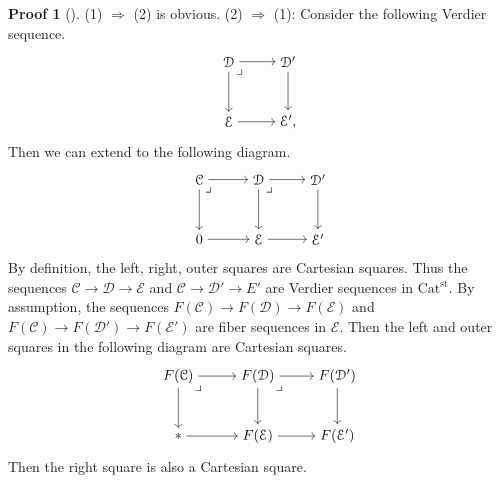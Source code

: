 \documentclass[a4paper,dvipdfmx,11pt,reqno]{amsart}
\newcommand{\C}{\mathcal{C}}
\newcommand{\D}{\mathcal{D}}
\newcommand{\E}{\mathcal{E}}
\newcommand{\Catst}{\mathrm{Cat^{st}}}
\theoremstyle{definition}
\newtheorem{newproof}[theorem]{Proof}
\begin{document}
\begin{newproof}[] \label{proof_of_CDH23.prop.1.5.5}
  (1) $\Rightarrow$ (2) is obvious.
  (2) $\Rightarrow$ (1): 
  Consider the following Verdier sequence.
  \[\begin{tikzpicture}[auto,->] 
    \node (tl) at (0,1.5) {$\D$}; 
    \node (tr) at (1.5,1.5) {$\D'$};
    \node (bl) at (0,0) {$\E$}; 
    \node (br) at (1.5,0) {$\E',$}; 
    \draw (tl) -- node {} (tr); 
    \draw (bl) -- node[swap] {} (br); 
    \draw (tl) -- node[swap] {} (bl);
    \draw (tr) -- node {} (br); 
    \node at (tl.south east) {$\lrcorner$};
  \end{tikzpicture}\]
  Then we can extend to the following diagram.
  \[\begin{tikzpicture}[auto,->] 
    \node (tl) at (0,1.5) {$\C$};
    \node (tm) at (1.5,1.5) {$\D$}; 
    \node (tr) at (3,1.5) {$\D'$};
    \node (bl) at (0,0) {$0$}; 
    \node (bm) at (1.5,0) {$\E$};
    \node (br) at (3,0) {$\E'$}; 
    \draw (tl) -- node {} (tm); 
    \draw (tm) -- node {} (tr); 
    \draw (bl) -- node[swap] {} (bm); 
    \draw (bm) -- node[swap] {} (br); 
    \draw (tl) -- node[swap] {} (bl);
    \draw (tm) -- node {} (bm);
    \draw (tr) -- node {} (br);
    \node at (tl.south east) {$\lrcorner$};
    \node at (tm.south east) {$\lrcorner$};
  \end{tikzpicture}\]
  By definition, the left, right, outer squares are Cartesian squares.
  Thus the sequences $\C \to \D \to \E$ and $\C \to \D' \to E'$ are Verdier sequences in $\Catst$.
  By assumption, the sequences $F(\C) \to F(\D) \to F(\E)$ and $F(\C) \to F(\D') \to F(\E')$ are fiber sequences in $\E$.
  Then the left and outer squares in the following diagram are Cartesian squares. 
  \[\begin{tikzpicture}[auto,->] 
    \node (tl) at (0,1.5) {$F(\C)$};
    \node (tm) at (2,1.5) {$F(\D)$}; 
    \node (tr) at (4,1.5) {$F(\D')$};
    \node (bl) at (0,0) {$\ast$}; 
    \node (bm) at (2,0) {$F(\E)$};
    \node (br) at (4,0) {$F(\E')$}; 
    \draw (tl) -- node {} (tm); 
    \draw (tm) -- node {} (tr); 
    \draw (bl) -- node[swap] {} (bm); 
    \draw (bm) -- node[swap] {} (br); 
    \draw (tl) -- node[swap] {} (bl);
    \draw (tm) -- node {} (bm);
    \draw (tr) -- node {} (br);
    \node at (tl.south east) {$\lrcorner$};
    \node at (tm.south east) {$\lrcorner$};
  \end{tikzpicture}\]
  Then the right square is also a Cartesian square.
\end{newproof}
\end{document}

